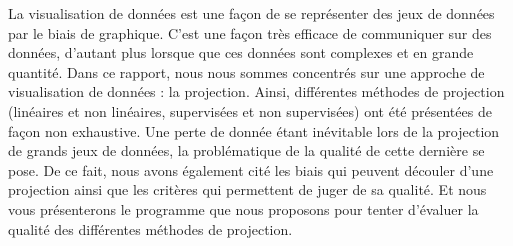
La visualisation de données est une façon de se représenter des jeux de données par le biais de graphique.
C'est une façon très efficace de communiquer sur des données, d'autant plus lorsque que ces données sont complexes et en grande quantité.
Dans ce rapport, nous nous sommes concentrés sur une approche de visualisation de données : la projection. 
Ainsi, différentes méthodes de projection (linéaires et non linéaires, supervisées et non supervisées) ont été présentées de façon non exhaustive. 
Une perte de donnée étant inévitable lors de la projection de grands jeux de données, la problématique de la qualité de cette dernière se pose. 
De ce fait, nous avons également cité les biais qui peuvent découler d'une projection ainsi que les critères qui permettent de juger de sa qualité.
Et nous vous présenterons le programme que nous proposons pour tenter d'évaluer la qualité des différentes méthodes de projection.

